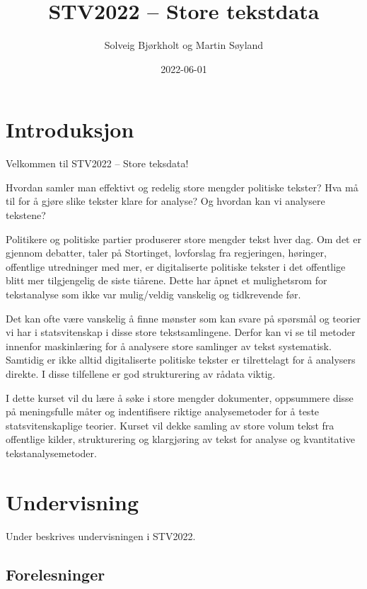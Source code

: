 \documentclass[
]{book}
\title{STV2022 -- Store tekstdata}
\author{Solveig Bjørkholt og Martin Søyland}
\date{2022-06-01}
\begin{document}
\maketitle

{
\setcounter{tocdepth}{1}
\tableofcontents
}
\hypertarget{introduksjon}{%
\chapter{Introduksjon}\label{introduksjon}}

Velkommen til STV2022 -- Store teksdata!

Hvordan samler man effektivt og redelig store mengder politiske tekster? Hva må til for å gjøre slike tekster klare for analyse? Og hvordan kan vi analysere tekstene?

Politikere og politiske partier produserer store mengder tekst hver dag. Om det er gjennom debatter, taler på Stortinget, lovforslag fra regjeringen, høringer, offentlige utredninger med mer, er digitaliserte politiske tekster i det offentlige blitt mer tilgjengelig de siste tiårene. Dette har åpnet et mulighetsrom for tekstanalyse som ikke var mulig/veldig vanskelig og tidkrevende før.

Det kan ofte være vanskelig å finne mønster som kan svare på spørsmål og teorier vi har i statsvitenskap i disse store tekstsamlingene. Derfor kan vi se til metoder innenfor maskinlæring for å analysere store samlinger av tekst systematisk. Samtidig er ikke alltid digitaliserte politiske tekster er tilrettelagt for å analysers direkte. I disse tilfellene er god strukturering av rådata viktig.

I dette kurset vil du lære å søke i store mengder dokumenter, oppsummere disse på meningsfulle måter og indentifisere riktige analysemetoder for å teste statsvitenskaplige teorier. Kurset vil dekke samling av store volum tekst fra offentlige kilder, strukturering og klargjøring av tekst for analyse og kvantitative tekstanalysemetoder.

\hypertarget{undervisning}{%
\chapter{Undervisning}\label{undervisning}}

Under beskrives undervisningen i STV2022.

\hypertarget{forelesninger}{%
\section{Forelesninger}\label{forelesninger}}
\end{document}
